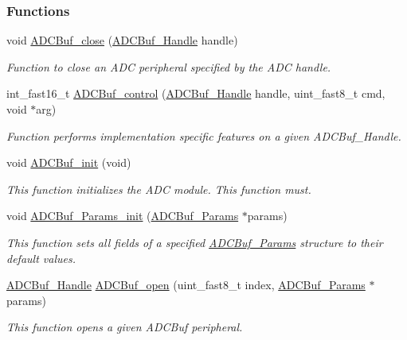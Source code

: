 \subsubsection*{Functions}
\begin{DoxyCompactItemize}
\item 
void \hyperlink{_a_d_c_buf_8h_a04ab5fae5da8f9ff77ab3ae4974d8f7d}{A\+D\+C\+Buf\+\_\+close} (\hyperlink{_a_d_c_buf_8h_a9b9646efcf7a7fd38a2935abd940cf96}{A\+D\+C\+Buf\+\_\+\+Handle} handle)
\begin{DoxyCompactList}\small\item\em Function to close an A\+D\+C peripheral specified by the A\+D\+C handle. \end{DoxyCompactList}\item 
int\+\_\+fast16\+\_\+t \hyperlink{_a_d_c_buf_8h_a9b9765fb0ac57dee9df234a79dcd5aea}{A\+D\+C\+Buf\+\_\+control} (\hyperlink{_a_d_c_buf_8h_a9b9646efcf7a7fd38a2935abd940cf96}{A\+D\+C\+Buf\+\_\+\+Handle} handle, uint\+\_\+fast8\+\_\+t cmd, void $\ast$arg)
\begin{DoxyCompactList}\small\item\em Function performs implementation specific features on a given A\+D\+C\+Buf\+\_\+\+Handle. \end{DoxyCompactList}\item 
void \hyperlink{_a_d_c_buf_8h_a88a0ab421304465b22417a7adef6c0c2}{A\+D\+C\+Buf\+\_\+init} (void)
\begin{DoxyCompactList}\small\item\em This function initializes the A\+D\+C module. This function must. \end{DoxyCompactList}\item 
void \hyperlink{_a_d_c_buf_8h_ae6ddd34c34fd06cdede98fb01033cc47}{A\+D\+C\+Buf\+\_\+\+Params\+\_\+init} (\hyperlink{struct_a_d_c_buf___params}{A\+D\+C\+Buf\+\_\+\+Params} $\ast$params)
\begin{DoxyCompactList}\small\item\em This function sets all fields of a specified \hyperlink{struct_a_d_c_buf___params}{A\+D\+C\+Buf\+\_\+\+Params} structure to their default values. \end{DoxyCompactList}\item 
\hyperlink{_a_d_c_buf_8h_a9b9646efcf7a7fd38a2935abd940cf96}{A\+D\+C\+Buf\+\_\+\+Handle} \hyperlink{_a_d_c_buf_8h_a0b63bca2e8f8e5b58f0c657ac662c97b}{A\+D\+C\+Buf\+\_\+open} (uint\+\_\+fast8\+\_\+t index, \hyperlink{struct_a_d_c_buf___params}{A\+D\+C\+Buf\+\_\+\+Params} $\ast$params)
\begin{DoxyCompactList}\small\item\em This function opens a given A\+D\+C\+Buf peripheral. \end{DoxyCompactList}\item 

\end{DoxyCompactItemize}
